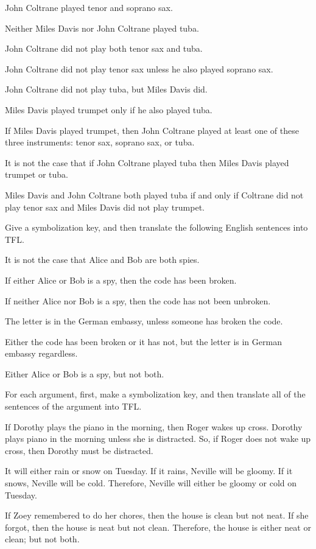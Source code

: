 \begin{earg}
\item John Coltrane played tenor and soprano sax. 
\item Neither Miles Davis nor John Coltrane played tuba. 
\item John Coltrane did not play both tenor sax and tuba. 
\item John Coltrane did not play tenor sax unless he also played soprano sax. 
\item John Coltrane did not play tuba, but Miles Davis did. 
\item Miles Davis played trumpet only if he also played tuba. 

\item If Miles Davis played trumpet, then John Coltrane played at least one of these three instruments: tenor sax, soprano sax, or tuba. 

\item It is not the case that if John Coltrane played tuba then Miles Davis played trumpet or tuba. 

\item Miles Davis and John Coltrane both played tuba if and only if Coltrane did not play tenor sax and Miles Davis did not play trumpet. 
\end{earg}


\problempart
\label{pr.spies}
Give a symbolization key, and then translate the following English sentences into TFL.
\begin{earg}
\item It is not the case that Alice and Bob are both spies.
\item If either Alice or Bob is a spy, then the code has been broken.
\item If neither Alice nor Bob is a spy, then the code has not been unbroken.
\item The letter is in the German embassy, unless someone has broken the code.
\item Either the code has been broken or it has not, but the letter is in German embassy regardless.
\item Either Alice or Bob is a spy, but not both.
\end{earg}


\problempart
For each argument, first, make a symbolization key, and then translate all of the sentences of the argument into TFL.
\begin{earg}
\item If Dorothy plays the piano in the morning, then Roger wakes up cross. Dorothy plays piano in the morning unless she is distracted. So, if Roger does not wake up cross, then Dorothy must be distracted.

\item It will either rain or snow on Tuesday. If it rains, Neville will be gloomy. If it snows, Neville will be cold. Therefore, Neville will either be gloomy or cold on Tuesday.

\item If Zoey remembered to do her chores, then the house is clean but not neat. If she forgot, then the house is neat but not clean. Therefore, the house is either neat or clean; but not both.
\end{earg}


